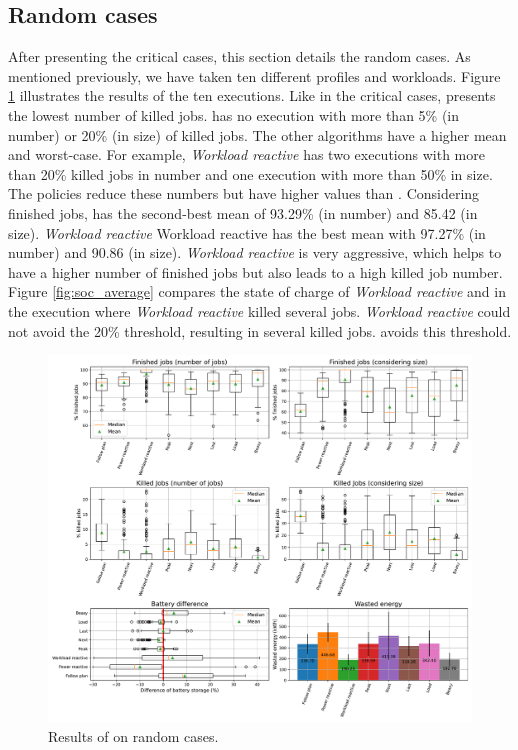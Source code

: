 \clearpage

\subsection{Random cases}

After presenting the critical cases, this section details the random cases. As mentioned previously, we have taken ten different profiles and workloads. Figure \ref{fig:beasy_average} illustrates the results of the ten executions. Like in the critical cases, \emph{\systemName} presents the lowest number of killed jobs. \emph{\systemName} has no execution with more than 5\% (in number) or 20\% (in size) of killed jobs. The other algorithms have a higher mean and worst-case. For example, \emph{Workload reactive} has two executions with more than 20\% killed jobs in number and one execution with more than 50\% in size. The policies reduce these numbers but have higher values than \emph{\systemName}. Considering finished jobs, \emph{\systemName} has the second-best mean of 93.29\% (in number) and 85.42 (in size). \emph{Workload reactive} Workload reactive has the best mean with 97.27\% (in number) and 90.86 (in size). \emph{Workload reactive} is very aggressive, which helps to have a higher number of finished jobs but also leads to a high killed job number. Figure \ref{fig:soc_average} compares the state of charge of \emph{Workload reactive} and \emph{\systemName} in the execution where \emph{Workload reactive} killed several jobs. \emph{Workload reactive} could not avoid the 20\% threshold, resulting in several killed jobs. \emph{\systemName} avoids this threshold.

\begin{figure}[!htb]
    \centering
    \includegraphics[scale=0.39]{Images/Heuristic/100_cases.pdf}
    \caption{Results of \emph{\systemName} on random cases.}
    \label{fig:beasy_average}
\end{figure}

